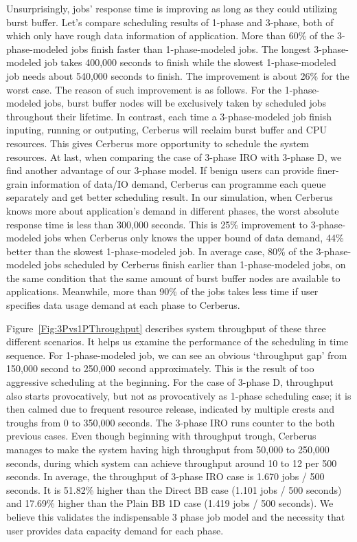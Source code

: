 Unsurprisingly, jobs' response time is improving as long as they could utilizing burst buffer.
Let's compare scheduling results of 1-phase and 3-phase, both of which only have rough data information of application.
More than 60\% of the 3-phase-modeled jobs finish faster than 1-phase-modeled jobs.
The longest 3-phase-modeled job takes 400,000 seconds to finish while the slowest 1-phase-modeled job
needs about 540,000 seconds to finish.
The improvement is about 26\% for the worst case.
The reason of such improvement is as follows.
For the 1-phase-modeled jobs, burst buffer nodes will be exclusively taken by scheduled jobs
throughout their lifetime.
In contrast, each time a 3-phase-modeled job finish inputing, running or outputing,
Cerberus will reclaim burst buffer and CPU resources.
This gives Cerberus more opportunity to schedule the system resources.
At last, when comparing the case of 3-phase IRO with 3-phase D, we find another advantage of our 3-phase model.
If benign users can provide finer-grain information of data/IO demand,
Cerberus can programme each queue separately and get better scheduling result.
In our simulation, when Cerberus knows more about application's demand in different phases,
the worst absolute response time is less than 300,000 seconds.
This is 25\% improvement to 3-phase-modeled jobs when Cerberus only knows the upper bound of data demand,
44\% better than the slowest 1-phase-modeled job.
In average case, 80\% of the 3-phase-modeled jobs scheduled by Cerberus finish earlier than 1-phase-modeled jobs,
on the same condition that the same amount of burst buffer nodes are available to applications.
Meanwhile, more than 90\% of the jobs takes less time if user specifies data usage demand
at each phase to Cerberus.

Figure~\ref{Fig:3Pvs1PThroughput} describes system throughput of these three different scenarios.
It helps us examine the performance of the scheduling in time sequence.
For 1-phase-modeled job, we can see an obvious `throughput gap'
from 150,000 second to 250,000 second approximately.
This is the result of too aggressive scheduling at the beginning.
For the case of 3-phase D, throughput also starts provocatively,
but not as provocatively as 1-phase scheduling case;
it is then calmed due to frequent resource release,
indicated by multiple crests and troughs from 0 to 350,000 seconds.
The 3-phase IRO runs counter to the both previous cases.
Even though beginning with throughput trough,
Cerberus manages to make the system having high throughput from 50,000 to 250,000 seconds,
during which system can achieve throughput around 10 to 12 per 500 seconds. 
In average, the throughput of 3-phase IRO case is 1.670 jobs / 500 seconds.
It is 51.82\% higher than the Direct BB case (1.101 jobs / 500 seconds) and
17.69\% higher than the Plain BB 1D case (1.419 jobs / 500 seconds).
We believe this validates the indispensable 3 phase job model and
the necessity that user provides data capacity demand for each phase.


